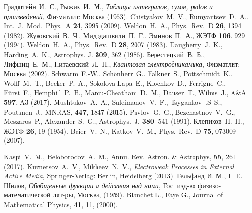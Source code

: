 \documentclass[cp1251%
               ]{jetp} %
\begin{document}
\begin{references}
%
Градштейн~И.~С.,  Рыжик~И.~М., {\it Таблицы интегралов, сумм, рядов и
   произведений}, Физматлит: Москва (1963). 
%
Chistyakov~M.~V., Rumyantsev~D.~A., 
   Int.~J.~Mod.~Phys.~A {\bf 24}, 3995 (2009).
%
Weldon~H.~A., Phys.~Rev.~D {\bf 26}, 1394 (1982).
%
Жуковский~В.~Ч., Мидодашвили~П.~Г., Эминов~П.~А., ЖЭТФ {\bf 106}, 929 (1994). 
%
Weldon~H.~A., Phys.~Rev.~D {\bf 28}, 2007 (1983).
%
Daugherty~J.~K., Harding~A.~K., Astrophys. J. {\bf 309}, 362 (1986).
%
Берестецкий~В.~Б., Лифшиц~Е.~М., Питаевский~Л.~П., {\it Квантовая электродникамика}, Физматлит: Москва (2002). 
%
Schwarm~F.-W.,  Sch{\"o}nherr~G.,  Falkner~S.,  Pottschmidt~K., Wolff~M.~T., Becker~P.~A., Sokolova-Lapa~E., Klochkov~D., Ferrigno~C., F{\"u}rst~F., Hemphill~P.~B., Marcu-Cheatham~D.~M., Dauser~T., Wilms~J., A{\&}A {\bf 597}, A3 (2017).
%
Mushtukov~A.~A., Suleimanov~V.~F., Tsygankov~.S~S., Poutanen~J., MNRAS, {\bf 447}, 1847 (2015).
%
Pavlov~G.~G., Bezchastnov~V.~G., Meszaros~P., Alexander~S.~G.,   
   Astrophys.~J. {\bf 380}, 541 (1991).
%
Клепиков~Н.~П., 
  ЖЭТФ \textbf{26}, 19 (1954).
%
Baier~V.~N., Katkov~V.~M., Phys.~Rev.~D {\bf 75}, 073009 (2007).

%
Kaspi~V.~M., Beloborodov~A.~M., Annu. Rev. Astron. \& Astrophys, {\bf 55}, 261 (2017).
%
Kuznetsov~A.~V., Mikheev~N.~V.,
   {\it Electroweak Processes in External Active Media}, 
   Springer-Verlag: Berlin, Heidelberg (2013).
%   
Гельфанд И. М., Г. Е. Шилов, 
{\it Обобщенные функции и действия над ними}, 
Гос. изд-во физико-математической лит-ры, Москва, 
(1959).
%
Blanchet L., Faye G.,
Journal of Mathematical Physics,
{\bf 41},
11,
(2000).
%


\end{references}
\end{document}
